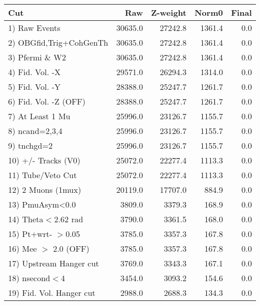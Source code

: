  \begin{table}[h!]\centering
 \begin{tabular}{||l||r|r|r|r||}
 \hline
 \hline
 Cut & Raw & Z-weight & Norm0 & Final \\
 \hline
  1) Raw Events           &     30635.0 &     27242.8 &      1361.4 &         0.0 \\
  2) OBGfid,Trig+CohGenTh &     30635.0 &     27242.8 &      1361.4 &         0.0 \\
  3) Pfermi \& W2         &     30635.0 &     27242.8 &      1361.4 &         0.0 \\
  4) Fid. Vol. -X         &     29571.0 &     26294.3 &      1314.0 &         0.0 \\
  5) Fid. Vol. -Y         &     28388.0 &     25247.7 &      1261.7 &         0.0 \\
  6) Fid. Vol. -Z (OFF)   &     28388.0 &     25247.7 &      1261.7 &         0.0 \\
  7) At Least 1 Mu        &     25996.0 &     23126.7 &      1155.7 &         0.0 \\
  8) ncand=2,3,4          &     25996.0 &     23126.7 &      1155.7 &         0.0 \\
  9) tnchgd=2             &     25996.0 &     23126.7 &      1155.7 &         0.0 \\
 10) +/- Tracks (V0)      &     25072.0 &     22277.4 &      1113.3 &         0.0 \\
 11) Tube/Veto Cut        &     25072.0 &     22277.4 &      1113.3 &         0.0 \\
 12) 2 Muons (1mux)       &     20119.0 &     17707.0 &       884.9 &         0.0 \\
 13) PmuAsym<0.0          &      3809.0 &      3379.3 &       168.9 &         0.0 \\
 14) Theta$<$2.62 rad     &      3790.0 &      3361.5 &       168.0 &         0.0 \\
 15) Pt+wrt- $>$0.05      &      3785.0 &      3357.3 &       167.8 &         0.0 \\
 16) Mee $>$ 2.0  (OFF)   &      3785.0 &      3357.3 &       167.8 &         0.0 \\
 17) Upstream Hanger cut  &      3769.0 &      3343.3 &       167.1 &         0.0 \\
 18) nsecond$<$4          &      3454.0 &      3093.2 &       154.6 &         0.0 \\
 19) Fid. Vol. Hanger cut &      2988.0 &      2688.3 &       134.3 &         0.0 \\

\end{tabular}
\end{table}
